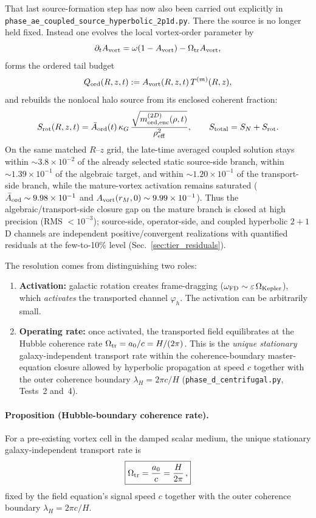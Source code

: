 \documentclass[11pt]{article}
\begin{document}
That last source-formation step has now also been carried out explicitly in
\nolinkurl{phase_ae_coupled_source_hyperbolic_2p1d.py}.  There the source is no
longer held fixed.  Instead one evolves the local vortex-order parameter by
\[
\partial_t A_{\rm vort}
= \omega(1-A_{\rm vort})-\Omega_{\rm tr}A_{\rm vort},
\]
forms the ordered tail budget
\[
Q_{\rm ord}(R,z,t):=A_{\rm vort}(R,z,t)\,T^{(m)}(R,z),
\]
and rebuilds the nonlocal halo source from its enclosed coherent fraction:
\[
S_{\rm rot}(R,z,t)
= \bar A_{\rm ord}(t)\,\kappa_G\,
\frac{\sqrt{m^{(2D)}_{{\rm ord},{\rm enc}}(\rho,t)}}{\rho_{\rm eff}^2},
\qquad
S_{\rm total}=S_N+S_{\rm rot}.
\]
On the same matched $R$--$z$ grid, the late-time averaged coupled solution stays
within $\sim3.8\times10^{-2}$ of the already selected static source-side branch,
within $\sim1.39\times10^{-1}$ of the algebraic target, and within
$\sim1.20\times10^{-1}$ of the transport-side branch, while the mature-vortex
activation remains saturated ($\bar A_{\rm ord}\sim9.98\times10^{-1}$ and
$A_{\rm vort}(r_M,0)\sim9.99\times10^{-1}$).  Thus the
algebraic/transport-side closure gap on the mature branch is closed at high
precision (RMS $<10^{-3}$); source-side, operator-side, and coupled
hyperbolic $2+1$D channels are independent positive/convergent realizations
with quantified residuals at the few-to-10\% level
(Sec.~\ref{sec:tier_residuals}).

The resolution comes from distinguishing two roles:
\begin{enumerate}
\item \textbf{Activation:} galactic rotation creates
  frame-dragging ($\omega_{\rm FD}\sim\varepsilon\,\Omega_{\rm Kepler}$),
  which \emph{activates} the transported channel $\varphi_h$.
  The activation can be arbitrarily small.
\item \textbf{Operating rate:} once activated, the transported
  field equilibrates at the Hubble coherence rate
  $\Omega_{\rm tr}=a_0/c=H/(2\pi)$.  This is the
  \emph{unique stationary} galaxy-independent transport rate within the
  coherence-boundary master-equation closure allowed by hyperbolic propagation
  at speed $c$ together with the outer coherence boundary
  $\lambda_H=2\pi c/H$
  (\texttt{phase\_d\_centrifugal.py}, Tests~2 and~4).
\end{enumerate}

\paragraph{Proposition (Hubble-boundary coherence rate).}
For a pre-existing vortex cell in the damped scalar medium, the unique
stationary galaxy-independent transport rate is
\begin{equation}
  \boxed{\Omega_{\rm tr} = \frac{a_0}{c} = \frac{H}{2\pi}\,,}
  \label{eq:omega_tr_derived}
\end{equation}
fixed by the field equation's signal speed $c$ together with the outer
coherence boundary $\lambda_H=2\pi c/H$.
\end{document}
